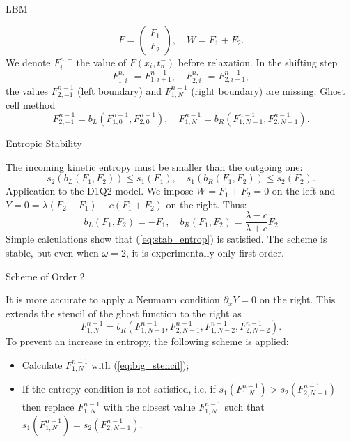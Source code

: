 \documentclass[english]{beamer}
\begin{document}
%
\begin{frame}{LBM}

\[
F=\left(\begin{array}{c}
F_{1}\\
F_{2}
\end{array}\right),\quad W=F_{1}+F_{2}.
\]
We denote $F_{i}^{n,-}$ the value of $F(x_{i},t_{n}^{-})$ before relaxation. In the shifting step
\[
F_{1,i}^{n,-}=F_{1,i+1}^{n-1},\quad F_{2,i}^{n,-}=F_{2,i-1}^{n-1},
\]
the values $F_{2,-1}^{n-1}$ (left boundary) and $F_{1,N}^{n-1}$ (right boundary) are missing. Ghost cell method
\[
F_{2,-1}^{n-1}=b_{L}(F_{1,0}^{n-1},F_{2,0}^{n-1}),\quad F_{1,N}^{n-1}=b_{R}(F_{1,N-1}^{n-1},F_{2,N-1}^{n-1}).
\]

\end{frame}
%
\begin{frame}{Entropic Stability \cite{audounet84,dubois88,aregba2004kinetic}}

The incoming kinetic entropy must be smaller than the outgoing one:
\begin{equation}
s_{2}(b_{L}(F_{1},F_{2}))\leq s_{1}(F_{1}),\quad s_{1}(b_{R}(F_{1},F_{2}))\leq s_{2}(F_{2}).\label{eq:stab_entrop}
\end{equation}
Application to the D1Q2 model. We impose $W=F_{1}+F_{2}=0$ on the left and $Y=0=\lambda(F_{2}-F_{1})-c(F_{1}+F_{2})$ on the right. Thus:
\[
b_{L}(F_{1},F_{2})=-F_{1},\quad b_{R}(F_{1},F_{2})=\frac{\lambda-c}{\lambda+c}F_{2}
\]
Simple calculations show that (\ref{eq:stab_entrop}) is satisfied.
The scheme is stable, but even when $\omega=2$, it is experimentally only first-order.
\end{frame}
%
 \begin{frame}{Scheme of Order 2}

It is more accurate to apply a Neumann condition\cite{drui2019analysis}
$\partial_{x}Y=0$ on the right. This extends the stencil of the ghost function
to the right as
\begin{equation}
F_{1,N}^{n-1}=b_{R}(F_{1,N-1}^{n-1},F_{2,N-1}^{n-1},F_{1,N-2}^{n-1},F_{2,N-2}^{n-1}).\label{eq:big_stencil}
\end{equation}
To prevent an increase in entropy, the following scheme is applied:
\begin{itemize}
\item Calculate $F_{1,N}^{n-1}$ with (\ref{eq:big_stencil});
\item If the entropy condition is not satisfied, i.e. if $s_{1}(F_{1,N}^{n-1})>s_{2}(F_{2,N-1}^{n-1})$
then replace $F_{1,N}^{n-1}$ with the closest value $\widetilde{F_{1,N}^{n-1}}$
such that $s_{1}(\widetilde{F_{1,N}^{n-1}})=s_{2}(F_{2,N-1}^{n-1})$.
\end{itemize}
\end{frame}
\end{document}

